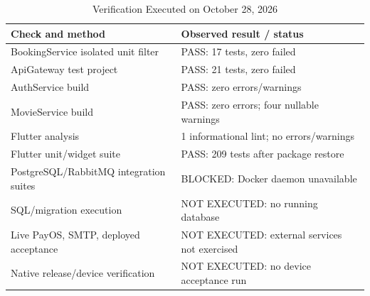 \begin{table}[t]
\caption{Verification Executed on October 28, 2026}\label{tab:tests}
\centering\footnotesize
\begin{tabularx}{\columnwidth}{@{}YY@{}}\toprule
Check and method & Observed result / status\\\midrule
BookingService isolated unit filter & PASS: 17 tests, zero failed\\
ApiGateway test project & PASS: 21 tests, zero failed\\
AuthService build & PASS: zero errors/warnings\\
MovieService build & PASS: zero errors; four nullable warnings\\
Flutter analysis & 1 informational lint; no errors/warnings\\
Flutter unit/widget suite & PASS: 209 tests after package restore\\
PostgreSQL/RabbitMQ integration suites & BLOCKED: Docker daemon unavailable\\
SQL/migration execution & NOT EXECUTED: no running database\\
Live PayOS, SMTP, deployed acceptance & NOT EXECUTED: external services not exercised\\
Native release/device verification & NOT EXECUTED: no device acceptance run\\\bottomrule
\end{tabularx}
\end{table}
